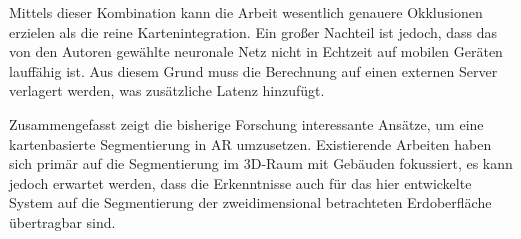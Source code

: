 Mittels dieser Kombination kann die Arbeit wesentlich genauere Okklusionen erzielen als die reine Kartenintegration. Ein großer Nachteil ist jedoch, dass das von den Autoren gewählte neuronale Netz nicht in Echtzeit auf mobilen Geräten lauffähig ist. Aus diesem Grund muss die Berechnung auf einen externen Server verlagert werden, was zusätzliche Latenz hinzufügt.

\medskip

Zusammengefasst zeigt die bisherige Forschung interessante Ansätze, um eine kartenbasierte Segmentierung in AR umzusetzen. Existierende Arbeiten haben sich primär auf die Segmentierung im 3D-Raum mit Gebäuden fokussiert, es kann jedoch erwartet werden, dass die Erkenntnisse auch für das hier entwickelte System auf die Segmentierung der zweidimensional betrachteten Erdoberfläche übertragbar sind.
